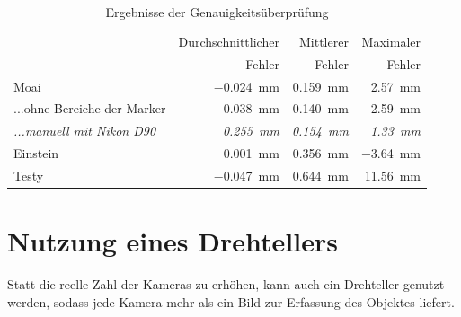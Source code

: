 \documentclass[./00PhotoBox.tex]{subfiles}
\begin{document}
\begin{table}
    \centering
    \caption{Ergebnisse der Genauigkeitsüberprüfung}
    \label{tab:vergleich_erg}
    \begin{tabular}{l|r|r|r}
        \toprule
                                          & Durchschnittlicher                & Mittlerer                         & Maximaler                        \\
                                          & Fehler                            & Fehler                            & Fehler                           \\
        \midrule
        Moai                              & \SI{-0,024}{\milli\metre}         & \SI{0,159}{\milli\metre}          & \SI{2,57}{\milli\metre}          \\  %
        ...ohne Bereiche der Marker       & \SI{-0,038}{\milli\metre}         & \SI{0,140}{\milli\metre}          & \SI{2,59}{\milli\metre}          \\  %
        \textit{...manuell mit Nikon D90} & \textit{\SI{0,255}{\milli\metre}} & \textit{\SI{0,154}{\milli\metre}} & \textit{\SI{1,33}{\milli\metre}} \\
        \midrule
        Einstein                          & \SI{0,001}{\milli\metre}          & \SI{0,356}{\milli\metre}          & \SI{-3,64}{\milli\metre}         \\
        \midrule
        Testy                             & \SI{-0,047}{\milli\metre}         & \SI{0,644}{\milli\metre}          & \SI{11,56}{\milli\metre}         \\
        \bottomrule
    \end{tabular}
\end{table}


\section{Nutzung eines Drehtellers}
\label{s:drehteller}
Statt die reelle Zahl der Kameras zu erhöhen, kann auch ein Drehteller genutzt werden, sodass jede Kamera mehr als ein Bild zur Erfassung des Objektes liefert.
\end{document}
